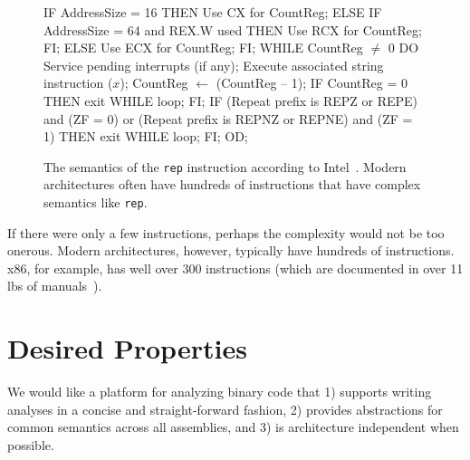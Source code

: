 \begin{figure}
\begin{footnotesize}
\begin{code}
  IF AddressSize = 16 
  THEN 
     Use CX for CountReg; 
  ELSE IF AddressSize = 64 and REX.W used 
     THEN Use RCX for CountReg; FI; 
  ELSE 
     Use ECX for CountReg; 
  FI; 
  WHILE CountReg $\neq$ 0 
  DO 
      Service pending interrupts (if any); 
      Execute associated string instruction ($x$);  
      CountReg $\leftarrow$ (CountReg – 1); 
      IF CountReg = 0 
      THEN exit WHILE loop; FI; 
      IF (Repeat prefix is REPZ or REPE) and (ZF = 0) 
         or (Repeat prefix is REPNZ or REPNE) and (ZF = 1) 
      THEN exit WHILE loop; FI; 
  OD; 
\end{code}
\end{footnotesize}
\caption{The semantics of the {\tt rep} instruction according to
  Intel~\cite{intel:x86}. Modern architectures often have hundreds of
  instructions that have complex semantics like {\tt rep}.}
\label{vine:rep}
\end{figure}

If there were only a few instructions, perhaps the complexity would
not be too onerous.  Modern architectures, however, typically have
hundreds of instructions. x86, for example, has well over 300
instructions (which are documented in over 11 lbs of
manuals~\cite{intel:x86}).



\section{Desired Properties}

We would like a platform for analyzing binary code that 1) supports
writing analyses in a concise and straight-forward fashion, 2)
provides abstractions for common semantics across all assemblies, and
3) is architecture independent when possible.

